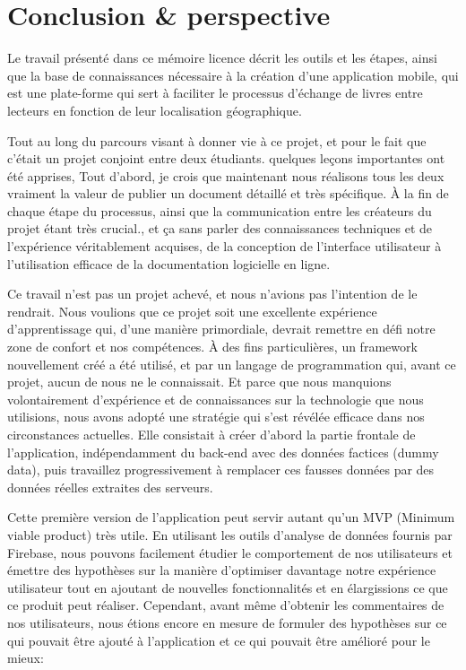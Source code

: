 \newpage

\chapter*{Conclusion \& perspective}

Le travail présenté dans ce mémoire licence décrit les outils et les étapes, ainsi que la base de connaissances nécessaire à la création d'une application mobile, qui est une plate-forme qui sert à faciliter le processus d'échange de livres entre lecteurs en fonction de leur localisation géographique.\medskip

Tout au long du parcours visant à donner vie à ce projet, et pour le fait que c’était un projet conjoint entre deux étudiants. quelques leçons importantes ont été apprises, Tout d’abord, je crois que maintenant nous réalisons tous les deux vraiment la valeur de publier un document détaillé et très spécifique. À la fin de chaque étape du processus, ainsi que la communication entre les créateurs du projet étant très crucial., et ça sans parler des connaissances techniques et de l'expérience véritablement acquises, de la conception de l'interface utilisateur à l'utilisation efficace de la documentation logicielle en ligne.\medskip

Ce travail n’est pas un projet achevé, et nous n’avions pas l’intention de le rendrait. Nous voulions que ce projet soit une excellente expérience d’apprentissage qui, d’une manière primordiale, devrait remettre en défi notre zone de confort et nos compétences. À des fins particulières, un framework nouvellement créé a été utilisé, et par un langage de programmation qui, avant ce projet, aucun de nous ne le connaissait. Et parce que nous manquions volontairement d'expérience et de connaissances sur la technologie que nous utilisions, nous avons adopté une stratégie qui s'est révélée efficace dans nos circonstances actuelles. Elle consistait à créer d'abord la partie frontale de l'application, indépendamment du \gls{back-end} avec des données factices (\gls{dummy data}), puis travaillez progressivement à remplacer ces fausses données par des données réelles extraites des serveurs.\medskip

Cette première version de l'application peut servir autant qu'un \acrshort{MVP} (Minimum viable product) très utile. En utilisant les outils d'analyse de données fournis par Firebase, nous pouvons facilement étudier le comportement de nos utilisateurs et émettre des hypothèses sur la manière d'optimiser davantage notre expérience utilisateur tout en ajoutant de nouvelles fonctionnalités et en élargissions ce que ce produit peut réaliser. Cependant, avant même d’obtenir les commentaires de nos utilisateurs, nous étions encore en mesure de formuler des hypothèses sur ce qui pouvait être ajouté à l’application et ce qui pouvait être amélioré pour le mieux:

